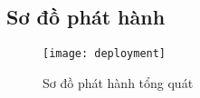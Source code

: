 \subsection{Sơ đồ phát hành}
\begin{figure}[h!]
	\begin{center}	
		\texttt{[image: deployment]}
		\caption{Sơ đồ phát hành tổng quát}
	\end{center}
\end{figure}
